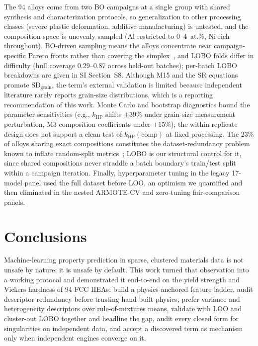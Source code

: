 \documentclass[5p,times,twocolumn]{elsarticle}
\begin{document}
The 94 alloys come from two BO campaigns at a single group with shared synthesis and characterization protocols, so generalization to other processing classes (severe plastic deformation, additive manufacturing) is untested, and the composition space is unevenly sampled (Al restricted to 0--4~at.\%, Ni-rich throughout). BO-driven sampling means the alloys concentrate near campaign-specific Pareto fronts rather than covering the simplex~\cite{Mulukutla2026BRAVE}, and LOBO folds differ in difficulty (hull coverage 0.29--0.87 across held-out batches); per-batch LOBO breakdowns are given in SI Section~S8. Although M15 and the SR equations promote $\text{SD}_\text{grain}$, the term's external validation is limited because independent literature rarely reports grain-size distributions, which is a reporting recommendation of this work. Monte Carlo and bootstrap diagnostics bound the parameter sensitivities (e.g., $k_\text{HP}$ shifts $\pm 39\%$ under grain-size measurement perturbation, M3 composition coefficients under $\pm 15\%$); the within-replicate design does not support a clean test of $k_\text{HP}(\text{comp})$ at fixed processing. The 23\% of alloys sharing exact compositions constitutes the dataset-redundancy problem known to inflate random-split metrics~\cite{LiMDHIT2024}; LOBO is our structural control for it, since shared compositions never straddle a batch boundary's train/test split within a campaign iteration. Finally, hyperparameter tuning in the legacy 17-model panel used the full dataset before LOO, an optimism we quantified and then eliminated in the nested ARMOTE-CV and zero-tuning fair-comparison panels.









\section{Conclusions}
\label{sec:conclusions}

Machine-learning property prediction in sparse, clustered materials data is not unsafe by nature; it is unsafe by default. This work turned that observation into a working protocol and demonstrated it end-to-end on the yield strength and Vickers hardness of 94 FCC HEAs: build a physics-anchored feature ladder, audit descriptor redundancy before trusting hand-built physics, prefer variance and heterogeneity descriptors over rule-of-mixtures means, validate with LOO and cluster-out LOBO together and headline the gap, audit every closed form for singularities on independent data, and accept a discovered term as mechanism only when independent engines converge on it.
\end{document}
